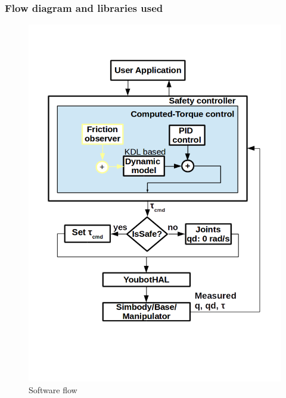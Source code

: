 \documentclass{beamer}
\begin{document}
\begin{frame}
	\frametitle{Flow diagram and libraries used}
	\vspace{-0.2cm}
\begin{figure}[H]
	\centering
	\includegraphics[trim=0 150 0 75,width=0.5\linewidth]{images/softwaredesign}
	\caption{Software flow}
\end{figure}	
\end{frame}
\end{document}
